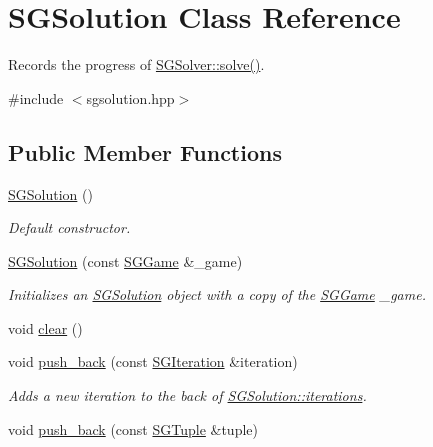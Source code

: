 \hypertarget{classSGSolution}{\section{S\-G\-Solution Class Reference}
\label{classSGSolution}
}


Records the progress of \hyperlink{classSGSolver_a220dd431eabdd9ff8419fafb28b7b990}{S\-G\-Solver\-::solve()}.  




{\ttfamily \#include $<$sgsolution.\-hpp$>$}

\subsection*{Public Member Functions}
\begin{DoxyCompactItemize}
\item 
\hypertarget{classSGSolution_a7f5f0bc77731b7e580f64cb3895caf23}{\hyperlink{classSGSolution_a7f5f0bc77731b7e580f64cb3895caf23}{S\-G\-Solution} ()}\label{classSGSolution_a7f5f0bc77731b7e580f64cb3895caf23}

\begin{DoxyCompactList}\small\item\em Default constructor. \end{DoxyCompactList}\item 
\hypertarget{classSGSolution_abea915fbaf1424b6c6fa745e2d844d07}{\hyperlink{classSGSolution_abea915fbaf1424b6c6fa745e2d844d07}{S\-G\-Solution} (const \hyperlink{classSGGame}{S\-G\-Game} \&\-\_\-game)}\label{classSGSolution_abea915fbaf1424b6c6fa745e2d844d07}

\begin{DoxyCompactList}\small\item\em Initializes an \hyperlink{classSGSolution}{S\-G\-Solution} object with a copy of the \hyperlink{classSGGame}{S\-G\-Game} \-\_\-game. \end{DoxyCompactList}\item 
void \hyperlink{classSGSolution_a68da05d07ecac89a12e8534e3cfb1cf1}{clear} ()
\item 
\hypertarget{classSGSolution_a6cda35ac7063b84ff58d8aad1117cf4d}{void \hyperlink{classSGSolution_a6cda35ac7063b84ff58d8aad1117cf4d}{push\-\_\-back} (const \hyperlink{classSGIteration}{S\-G\-Iteration} \&iteration)}\label{classSGSolution_a6cda35ac7063b84ff58d8aad1117cf4d}

\begin{DoxyCompactList}\small\item\em Adds a new iteration to the back of \hyperlink{classSGSolution_a7216ae67bed2fb1ede826053c1612fcb}{S\-G\-Solution\-::iterations}. \end{DoxyCompactList}\item 
\hypertarget{classSGSolution_ad800f6067621bd28261602cda3ee09b8}{void \hyperlink{classSGSolution_ad800f6067621bd28261602cda3ee09b8}{push\-\_\-back} (const \hyperlink{classSGTuple}{S\-G\-Tuple} \&tuple)}\label{classSGSolution_ad800f6067621bd28261602cda3ee09b8}


\end{DoxyCompactItemize}
